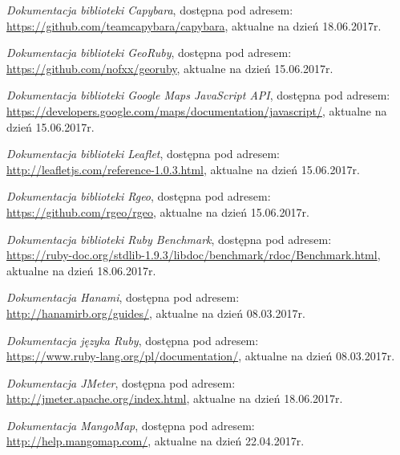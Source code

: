 \documentclass[printmode]{mgr}
\begin{document}
\begin{thebibliography}{99}

  \emph{Dokumentacja biblioteki Capybara}, dostępna pod adresem:\\ \url{https://github.com/teamcapybara/capybara}, aktualne na dzień 18.06.2017r.

  \emph{Dokumentacja biblioteki GeoRuby}, dostępna pod adresem:\\ \url{https://github.com/nofxx/georuby}, aktualne na dzień 15.06.2017r.

  \emph{Dokumentacja biblioteki Google Maps JavaScript API}, dostępna pod adresem:\\ \url{https://developers.google.com/maps/documentation/javascript/}, aktualne na dzień 15.06.2017r.

  \emph{Dokumentacja biblioteki Leaflet}, dostępna pod adresem:\\ \url{http://leafletjs.com/reference-1.0.3.html}, aktualne na dzień 15.06.2017r.

  \emph{Dokumentacja biblioteki Rgeo}, dostępna pod adresem:\\ \url{https://github.com/rgeo/rgeo}, aktualne na dzień 15.06.2017r.

  \emph{Dokumentacja biblioteki Ruby Benchmark}, dostępna pod adresem:\\ \url{https://ruby-doc.org/stdlib-1.9.3/libdoc/benchmark/rdoc/Benchmark.html}, aktualne na dzień 18.06.2017r.

  \emph{Dokumentacja Hanami}, dostępna pod adresem:\\ \url{http://hanamirb.org/guides/}, aktualne na dzień 08.03.2017r.

  \emph{Dokumentacja języka Ruby}, dostępna pod adresem:\\ \url{https://www.ruby-lang.org/pl/documentation/}, aktualne na dzień 08.03.2017r.

  \emph{Dokumentacja JMeter}, dostępna pod adresem:\\ \url{http://jmeter.apache.org/index.html}, aktualne na dzień 18.06.2017r.

  \emph{Dokumentacja MangoMap}, dostępna pod adresem:\\ \url{http://help.mangomap.com/}, aktualne na dzień 22.04.2017r.


\end{thebibliography}
\end{document}
